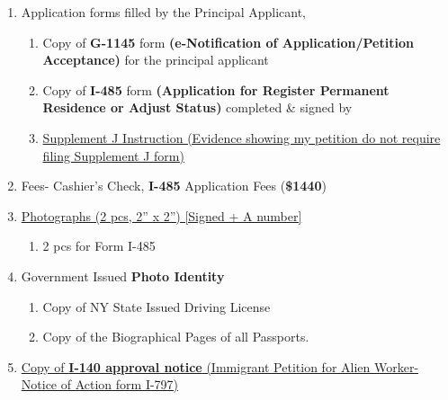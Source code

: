 \begin{enumerate}[label=\textbf{ Exhibit-\arabic*}]
    \item {Application forms filled by the Principal Applicant,}\begin{enumerate}[label=\roman*.]
        
        \item Copy of \textbf{G-1145} form \textbf{(e-Notification of Application/Petition Acceptance)} for the principal applicant
        
        \item Copy of \textbf{I-485} form \textbf{(Application for Register Permanent Residence or Adjust Status)} completed \& signed by \pApplicant
        \item \hyperref[exhibit1b]{Supplement J Instruction (Evidence showing my petition do not require filing Supplement J form)}
    \end{enumerate}
    \item Fees- Cashier's Check, \textbf{I-485} Application Fees (\textbf{\$1440})
    
    \item \hyperref[exhibit2]{Photographs (2 pcs, 2” x 2”) [Signed + A number]} \begin{enumerate}[label=\roman*.]
        \item {2 pcs for Form I-485}
    \end{enumerate}

     \item {Government Issued \textbf{Photo Identity}}\begin{enumerate}[label=\roman*.]
        \item Copy of NY State Issued Driving License
        \item Copy of the Biographical Pages of all Passports.
    \end{enumerate}
    
    \item \hyperref[exhibit1]{Copy of \textbf{ I-140 approval notice} (Immigrant Petition for Alien Worker- Notice of Action form I-797)}
    


\end{enumerate}
